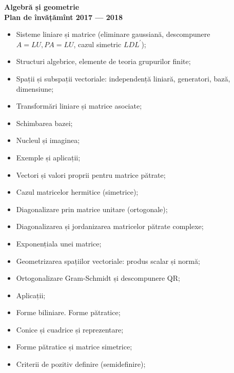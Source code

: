 \documentclass[a4paper,11pt]{article}
\begin{document}
\begin{center}
  {\Large\textbf{Algebră și geometrie \\ Plan de învățămînt 2017 --- 2018 }}
\end{center}
\vspace{1cm}


\begin{itemize}
  \item Sisteme liniare și matrice (eliminare gaussiană, descompunere $A = LU, PA = LU$, cazul simetric $LDL^\prime$);
  \item Structuri algebrice, elemente de teoria grupurilor finite;
    \vspace{0.5cm}

  \item Spații și subspații vectoriale: independență liniară, generatori, bază, dimensiune;
  \item Transformări liniare și matrice asociate;
  \item Schimbarea bazei;
  \item Nucleul și imaginea;
  \item Exemple și aplicații;
    \vspace{0.5cm}

  \item Vectori și valori proprii pentru matrice pătrate;
  \item Cazul matricelor hermitice (simetrice);
  \item Diagonalizare prin matrice unitare (ortogonale);
  \item Diagonalizarea și jordanizarea matricelor pătrate complexe;
  \item Exponențiala unei matrice;
    \vspace{0.5cm}

  \item Geometrizarea spațiilor vectoriale: produs scalar și normă;
  \item Ortogonalizare Gram-Schmidt și descompunere QR;
  \item Aplicații;
    \vspace{0.5cm}

  \item Forme biliniare. Forme pătratice;
  \item Conice și cuadrice și reprezentare;
  \item Forme pătratice și matrice simetrice;
  \item Criterii de pozitiv definire (semidefinire);
    \vspace{0.5cm}
    

\end{itemize}
\end{document}
